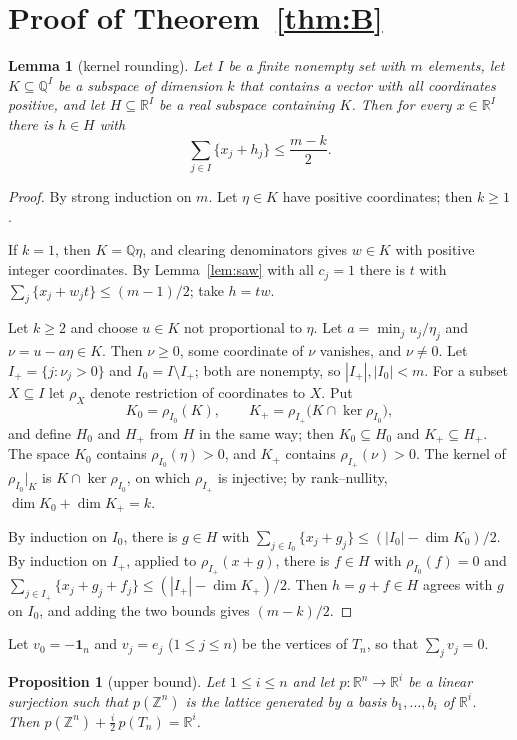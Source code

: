 \documentclass[11pt]{article}
\newtheorem{lemma}[theorem]{Lemma}
\newtheorem{proposition}[theorem]{Proposition}
\theoremstyle{definition}
\theoremstyle{remark}
\newcommand{\R}{\mathbb R}
\newcommand{\Z}{\mathbb Z}
\newcommand{\Q}{\mathbb Q}
\newcommand{\one}{\mathbf 1}
\newcommand{\fr}[1]{\{#1\}}
\begin{document}
\section{Proof of Theorem~\ref{thm:B}}\label{sec:B}

\begin{lemma}[kernel rounding]\label{lem:round}
Let $I$ be a finite nonempty set with $m$ elements, let $K\subseteq\Q^I$ be a
subspace of dimension $k$ that contains a vector with all coordinates
positive, and let $H\subseteq\R^I$ be a real subspace containing $K$. Then for
every $x\in\R^I$ there is $h\in H$ with
\[
\sum_{j\in I}\fr{x_j+h_j}\le\frac{m-k}2 .
\]
\end{lemma}

\begin{proof}
By strong induction on $m$. Let $\eta\in K$ have positive coordinates; then
$k\ge1$.

If $k=1$, then $K=\Q\eta$, and clearing denominators gives $w\in K$ with
positive integer coordinates. By Lemma~\ref{lem:saw} with all $c_j=1$ there is
$t$ with $\sum_j\fr{x_j+w_jt}\le(m-1)/2$; take $h=tw$.

Let $k\ge2$ and choose $u\in K$ not proportional to $\eta$. Let
$a=\min_ju_j/\eta_j$ and $\nu=u-a\eta\in K$. Then $\nu\ge0$, some coordinate
of $\nu$ vanishes, and $\nu\ne0$. Let $I_+=\{j:\nu_j>0\}$ and
$I_0=I\setminus I_+$; both are nonempty, so $|I_+|,|I_0|<m$. For a subset
$X\subseteq I$ let $\rho_X$ denote restriction of coordinates to $X$. Put
\[
K_0=\rho_{I_0}(K),\qquad K_+=\rho_{I_+}\bigl(K\cap\ker\rho_{I_0}\bigr),
\]
and define $H_0$ and $H_+$ from $H$ in the same way; then $K_0\subseteq H_0$
and $K_+\subseteq H_+$. The space $K_0$ contains $\rho_{I_0}(\eta)>0$, and
$K_+$ contains $\rho_{I_+}(\nu)>0$. The kernel of $\rho_{I_0}|_K$ is
$K\cap\ker\rho_{I_0}$, on which $\rho_{I_+}$ is injective; by rank--nullity,
$\dim K_0+\dim K_+=k$.

By induction on $I_0$, there is $g\in H$ with
$\sum_{j\in I_0}\fr{x_j+g_j}\le(|I_0|-\dim K_0)/2$. By induction on $I_+$,
applied to $\rho_{I_+}(x+g)$, there is $f\in H$ with $\rho_{I_0}(f)=0$ and
$\sum_{j\in I_+}\fr{x_j+g_j+f_j}\le(|I_+|-\dim K_+)/2$. Then $h=g+f\in H$
agrees with $g$ on $I_0$, and adding the two bounds gives $(m-k)/2$.
\end{proof}

Let $v_0=-\one_n$ and $v_j=e_j$ ($1\le j\le n$) be the vertices of $T_n$, so
that $\sum_jv_j=0$.

\begin{proposition}[upper bound]\label{prop:upper}
Let $1\le i\le n$ and let $p\colon\R^n\to\R^i$ be a linear surjection such
that $p(\Z^n)$ is the lattice generated by a basis $b_1,\dots,b_i$ of $\R^i$.
Then $p(\Z^n)+\frac i2\,p(T_n)=\R^i$.
\end{proposition}
\end{document}
